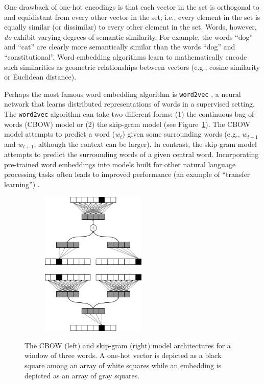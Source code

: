 \documentclass{article}
\begin{document}
One drawback of one-hot encodings is that each vector in the set is orthogonal to and equidistant from every other vector in the set; i.e., every element in the set is equally similar (or dissimilar) to every other element in the set. Words, however, \emph{do} exhibit varying degrees of semantic similarity. For example, the words ``dog'' and ``cat'' are clearly more semantically similar than the words ``dog'' and ``constitutional''. Word embedding algorithms learn to mathematically encode such similarities as geometric relationships between vectors (e.g., cosine similarity or Euclidean distance).

Perhaps the most famous word embedding algorithm is \texttt{word2vec} \parencite{Mikolov2013}, a neural network that learns distributed representations of words in a supervised setting. The \texttt{word2vec} algorithm can take two different forms: (1) the continuous bag-of-words (CBOW) model or (2) the skip-gram model (see Figure~\ref{fig:word2vec}). The CBOW model attempts to predict a word ($w_t$) given some surrounding words (e.g., $w_{t-1}$ and $w_{t+1}$, although the context can be larger). In contrast, the skip-gram model attempts to predict the surrounding words of a given central word. Incorporating pre-trained word embeddings into models built for other natural language processing tasks often leads to improved performance (an example of ``transfer learning'') \parencite{Bengio2003}.

\begin{figure}[h]
\captionsetup[subfigure]{labelformat=empty}
\centering

    \begin{subfigure}[t]{0.45\textwidth}
    \centering
    \includegraphics[width=5cm]{cbow_fig.png}
    \caption{}
    \end{subfigure}%
    \begin{subfigure}[t]{0.45\textwidth}
    \centering
    \includegraphics[width=5cm]{skip_gram.png}
    \caption{}
    \end{subfigure}

\caption{The CBOW (left) and skip-gram (right) model architectures for a window of three words. A one-hot vector is depicted as a black square among an array of white squares while an embedding is depicted as an array of gray squares.}
\label{fig:word2vec}
\end{figure}
\end{document}
